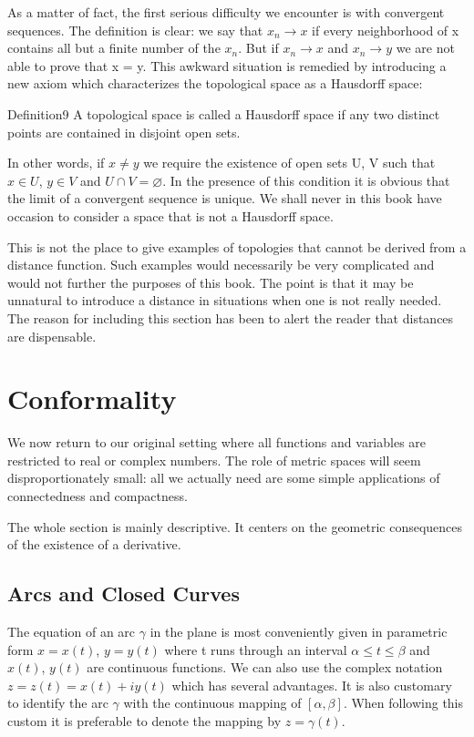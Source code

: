 As a matter of fact, the first serious difficulty we encounter is with
convergent sequences. The definition is clear: we say that $x_{n} \rightarrow x$ if every neighborhood of x contains all but a finite number of the $x_{n}$. But if $x_{n} \rightarrow x$ and $x_{n} \rightarrow y$ we are not able to prove that x = y. This awkward situation is remedied by introducing a new axiom which characterizes the topological space as a Hausdorff space:

\begin{originalstatement}{Definition}{9}\label{def:3.9}
A topological space is called a Hausdorff space if any two distinct points are contained in disjoint open sets.
\end{originalstatement}
In other words, if $x \neq y$ we require the existence of open sets U, V such that $x \in U$, $y \in V$ and $U \cap V = \varnothing$. In the presence of this condition it is obvious that the limit of a convergent sequence is unique. We shall never in this book have occasion to consider a space that is not a Hausdorff space.

This is not the place to give examples of topologies that cannot be derived from a distance function. Such examples would necessarily be very complicated and would not further the purposes of this book. The point is that it may be unnatural to introduce a distance in situations when one is not really needed. The reason for including this section has been to alert the reader that distances are dispensable.

\setcounter{section}{1}\section{Conformality}\label{sec:3.2}
We now return to our original setting where all functions and variables are restricted to real or complex numbers. The role of metric spaces will seem disproportionately small: all we actually need are some simple applications of connectedness and compactness.

The whole section is mainly descriptive. It centers on the geometric consequences of the existence of a derivative.

\setcounter{section}{2}\setcounter{subsection}{0}\subsection{Arcs and Closed Curves}\label{sec:3.2.1}
The equation of an arc $\gamma$ in the plane is most conveniently given in parametric form $x = x(t)$, $y = y(t)$ where t runs through an interval $\alpha \leq t \leq \beta$ and $x(t)$, $y(t)$ are continuous functions. We can also use the complex notation $z = z(t) = x(t) + iy(t)$ which has several advantages. It is also customary to identify the arc $\gamma$ with the continuous mapping of $[\alpha, \beta]$. When following this custom it is preferable to denote the mapping by $z = \gamma(t)$.

